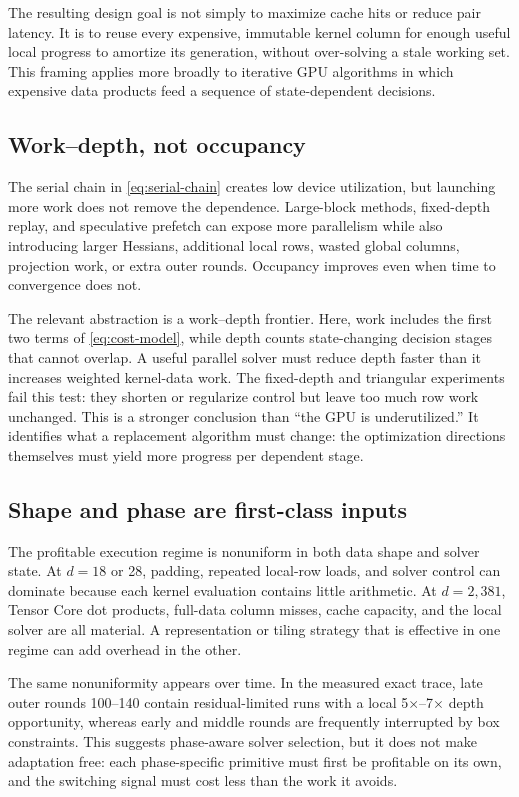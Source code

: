 The resulting design goal is not simply to maximize cache hits or reduce pair
latency. It is to reuse every expensive, immutable kernel column for enough
useful local progress to amortize its generation, without over-solving a stale
working set. This framing applies more broadly to iterative GPU algorithms in
which expensive data products feed a sequence of state-dependent decisions.

\subsection{Work--depth, not occupancy}

The serial chain in \cref{eq:serial-chain} creates low device utilization, but
launching more work does not remove the dependence. Large-block methods,
fixed-depth replay, and speculative prefetch can expose more parallelism while
also introducing larger Hessians, additional local rows, wasted global
columns, projection work, or extra outer rounds. Occupancy improves even when
time to convergence does not.

The relevant abstraction is a work--depth frontier. Here, work includes the
first two terms of \cref{eq:cost-model}, while depth counts state-changing
decision stages that cannot overlap. A useful parallel solver must reduce
depth faster than it increases weighted kernel-data work. The fixed-depth and
triangular experiments fail this test: they shorten or regularize control but
leave too much row work unchanged. This is a stronger conclusion than
``the GPU is underutilized.'' It identifies what a replacement algorithm must
change: the optimization directions themselves must yield more progress per
dependent stage.

\subsection{Shape and phase are first-class inputs}

The profitable execution regime is nonuniform in both data shape and solver
state. At $d=18$ or 28, padding, repeated local-row loads, and solver control
can dominate because each kernel evaluation contains little arithmetic. At
$d=2{,}381$, Tensor Core dot products, full-data column misses, cache capacity,
and the local solver are all material. A representation or tiling strategy
that is effective in one regime can add overhead in the other.

The same nonuniformity appears over time. In the measured exact trace, late
outer rounds 100--140 contain residual-limited runs with a local
5$\times$--7$\times$ depth opportunity, whereas early and middle rounds are
frequently interrupted by box constraints. This suggests phase-aware solver
selection, but it does not make adaptation free: each phase-specific primitive
must first be profitable on its own, and the switching signal must cost less
than the work it avoids.

